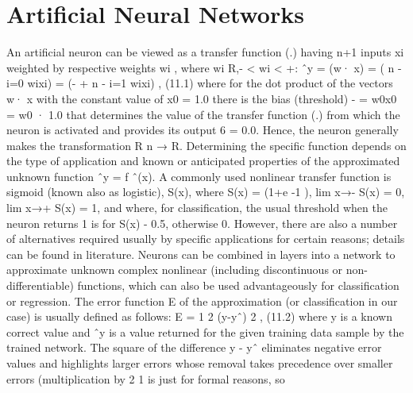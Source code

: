 \documentclass[11pt,openany,executivepaper]{book}
\begin{document}
\section{Artificial Neural Networks}

An artificial neuron can be viewed as a transfer function (.) having n+1 inputs
xi weighted by respective weights wi
, where wi  R,- < wi < +:
ˆy = (w· x) = (
n
-
i=0
wixi) = (- +
n
-
i=1
wixi) , (11.1)
where for the dot product of the vectors w· x with the constant value of x0 =
1.0 there is the bias (threshold) - = w0x0 = w0 · 1.0 that determines the value
of the transfer function (.) from which the neuron is activated and provides its
output 6 = 0.0. Hence, the neuron generally makes the transformation R
n → R.
Determining the specific  function depends on the type of application and
known or anticipated properties of the approximated unknown function ˆy = f
ˆ(x).
A commonly used nonlinear transfer function  is sigmoid (known also as logistic), S(x), where
S(x) = (1+e
-1
), lim
x→-
S(x) = 0, lim
x→+
S(x) = 1,
and where, for classification, the usual threshold when the neuron returns 1 is
for S(x) - 0.5, otherwise 0. However, there are also a number of alternatives
required usually by specific applications for certain reasons; details can be found
in literature.
Neurons can be combined in layers into a network to approximate unknown
complex nonlinear (including discontinuous or non-differentiable) functions,
which can also be used advantageously for classification or regression. The error
function E of the approximation (or classification in our case) is usually defined
as follows:
E =
1
2
(y-yˆ)
2
, (11.2)
where y is a known correct value and ˆy is a value returned for the given
training data sample by the trained network. The square of the difference y - yˆ
eliminates negative error values and highlights larger errors whose removal takes
precedence over smaller errors (multiplication by 2
1
is just for formal reasons, so
\end{document}
